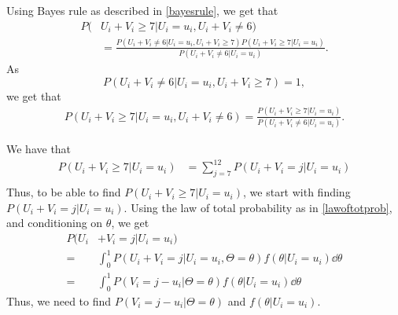 Using Bayes rule as described in \eqref{bayesrule}, we get that
\begin{equation}
\label{redmajor2}
    \begin{aligned}
        P(&U_i+V_i \geq 7 | U_i=u_i,U_i+V_i \neq 6) \\[6pt]
        &= \frac{P(U_i+V_i\neq6|U_i=u_i,U_i+V_i\geq7)P(U_i+V_i\geq7|U_i=u_i)}{P(U_i+V_i\neq6|U_i=u_i)}.
    \end{aligned}
\end{equation}
As 
\begin{equation*}
    P(U_i+V_i\neq6|U_i=u_i,U_i+V_i\geq7) = 1,
\end{equation*}
we get that
\begin{equation}
\label{redmajor3}
    \begin{aligned}
        P(U_i+V_i \geq 7 | U_i=u_i,U_i+V_i \neq 6)
        = \frac{P(U_i+V_i\geq7|U_i=u_i)}{P(U_i+V_i\neq6|U_i=u_i)}.
    \end{aligned}
\end{equation}


We have that
\begin{equation}
\label{redmajor1}
    \begin{aligned}
        P(U_i+V_i \geq 7 | U_i=u_i) 
        &= \sum_{j=7}^{12} P(U_i+V_i = j | U_i=u_i)\\[6pt]
    \end{aligned}
\end{equation}
Thus, to be able to find $P(U_i+V_i \geq 7 | U_i=u_i)$, we start with finding $P(U_i+V_i = j | U_i=u_i)$. Using the law of total probability as in \eqref{lawoftotprob}, and conditioning on $\theta$, we get
\begin{equation} 
\label{prob_red_major}
    \begin{aligned}
        P(U_i&+V_i = j | U_i=u_i) \\[6pt]
        =& \int_0^1 P(U_i+V_i = j | U_i=u_i, \Theta=\theta) f(\theta| U_i=u_i) \dd \theta \\[6pt]
        =& \int_0^1 P(V_i = j-u_i | \Theta=\theta) f(\theta| U_i=u_i) \dd \theta
    \end{aligned}
\end{equation}
Thus, we need to find $P(V_i = j-u_i | \Theta=\theta)$ and $f(\theta| U_i=u_i)$. 

